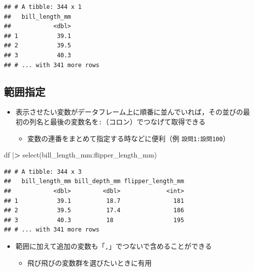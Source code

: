 \documentclass[
  xelatex,ja=standard, b5paper]{bxjsbook}
\newenvironment{Shaded}{\begin{snugshade}}{\end{snugshade}}
\newcommand{\ErrorTok}[1]{\textcolor[rgb]{0.64,0.00,0.00}{\textbf{#1}}}
\newcommand{\FunctionTok}[1]{\textcolor[rgb]{0.00,0.00,0.00}{#1}}
\newcommand{\NormalTok}[1]{#1}
\newcommand{\SpecialCharTok}[1]{\textcolor[rgb]{0.00,0.00,0.00}{#1}}
\providecommand{\tightlist}{%
  \setlength{\itemsep}{0pt}\setlength{\parskip}{0pt}}
\begin{document}
\begin{verbatim}
## # A tibble: 344 x 1
##   bill_length_mm
##            <dbl>
## 1           39.1
## 2           39.5
## 3           40.3
## # ... with 341 more rows
\end{verbatim}

\hypertarget{select-range}{%
\subsection{範囲指定}\label{select-range}}

\begin{itemize}
\tightlist
\item
  表示させたい変数がデータフレーム上に順番に並んでいれば，その並びの最初の列名と最後の変数名を\texttt{:}（コロン）でつなげて取得できる

  \begin{itemize}
  \tightlist
  \item
    変数の連番をまとめて指定する時などに便利（例 \texttt{設問1:設問100}）
  \end{itemize}
\end{itemize}

\begin{Shaded}
\begin{Highlighting}[]
\NormalTok{df }\SpecialCharTok{|}\ErrorTok{\textgreater{}} 
  \FunctionTok{select}\NormalTok{(bill\_length\_mm}\SpecialCharTok{:}\NormalTok{flipper\_length\_mm)}
\end{Highlighting}
\end{Shaded}

\begin{verbatim}
## # A tibble: 344 x 3
##   bill_length_mm bill_depth_mm flipper_length_mm
##            <dbl>         <dbl>             <int>
## 1           39.1          18.7               181
## 2           39.5          17.4               186
## 3           40.3          18                 195
## # ... with 341 more rows
\end{verbatim}

\begin{itemize}
\tightlist
\item
  範囲に加えて追加の変数も「\texttt{,}」でつないで含めることができる

  \begin{itemize}
  \tightlist
  \item
    飛び飛びの変数群を選びたいときに有用
  \end{itemize}
\end{itemize}
\end{document}
